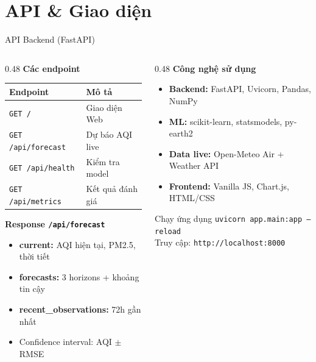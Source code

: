 \documentclass[aspectratio=169]{beamer}
\begin{document}
\section{API \& Giao diện}

\begin{frame}{API Backend (FastAPI)}
  \begin{columns}[T]
    \begin{column}{0.48\textwidth}
      \textbf{Các endpoint}
      \begin{center}
        \begin{tabular}{ll}
          \toprule
          \textbf{Endpoint} & \textbf{Mô tả} \\
          \midrule
          \texttt{GET /}              & Giao diện Web \\
          \texttt{GET /api/forecast}  & Dự báo AQI live \\
          \texttt{GET /api/health}    & Kiểm tra model \\
          \texttt{GET /api/metrics}   & Kết quả đánh giá \\
          \bottomrule
        \end{tabular}
      \end{center}
      \vspace{0.3em}
      \textbf{Response \texttt{/api/forecast}}
      \begin{itemize}\small
        \item \textbf{current:} AQI hiện tại, PM2.5, thời tiết
        \item \textbf{forecasts:} 3 horizons + khoảng tin cậy
        \item \textbf{recent\_observations:} 72h gần nhất
        \item Confidence interval: AQI $\pm$ RMSE
      \end{itemize}
    \end{column}
    \begin{column}{0.48\textwidth}
      \textbf{Công nghệ sử dụng}
      \begin{itemize}
        \item \textbf{Backend:} FastAPI, Uvicorn, Pandas, NumPy
        \item \textbf{ML:} scikit-learn, statsmodels, py-earth2
        \item \textbf{Data live:} Open-Meteo Air + Weather API
        \item \textbf{Frontend:} Vanilla JS, Chart.js, HTML/CSS
      \end{itemize}
      \vspace{0.5em}
      \begin{block}{Chạy ứng dụng}
        \centering
        \texttt{uvicorn app.main:app --reload}\\
        \vspace{0.2em}
        Truy cập: \texttt{http://localhost:8000}
      \end{block}
    \end{column}
  \end{columns}
\end{frame}
\end{document}
